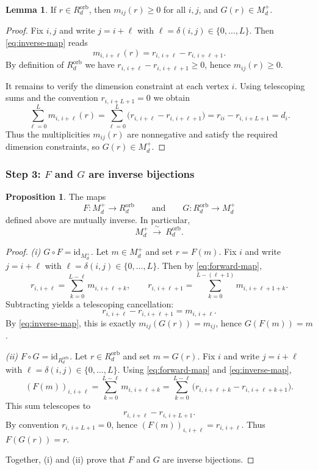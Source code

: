 \documentclass{article}
\theoremstyle{definition}
\newtheorem{proposition}[theorem]{Proposition}
\newtheorem{lemma}[theorem]{Lemma}
\begin{document}
\begin{lemma}\label{lem:inverse-well-defined}
If $r\in R_d^{\mathrm{orb}}$, then $m_{ij}(r)\ge 0$ for all $i,j$, and
$G(r)\in M_d^+$.
\end{lemma}

\begin{proof}
Fix $i,j$ and write $j=i+\ell$ with $\ell=\delta(i,j)\in\{0,\dots,L\}$.
Then \eqref{eq:inverse-map} reads
\[
m_{i,\,i+\ell}(r)=r_{i,\,i+\ell}-r_{i,\,i+\ell+1}.
\]
By definition of $R_d^{\mathrm{orb}}$ we have
$r_{i,\,i+\ell}-r_{i,\,i+\ell+1}\ge 0$, hence $m_{ij}(r)\ge 0$.

It remains to verify the dimension constraint at each vertex $i$.
Using telescoping sums and the convention $r_{i,\,i+L+1}=0$ we obtain
\[
\sum_{\ell=0}^{L} m_{i,\,i+\ell}(r)
=
\sum_{\ell=0}^{L} \bigl(r_{i,\,i+\ell}-r_{i,\,i+\ell+1}\bigr)
=
r_{ii}-r_{i,\,i+L+1}
=
d_i.
\]
Thus the multiplicities $m_{ij}(r)$ are nonnegative and satisfy the required
dimension constraints, so $G(r)\in M_d^+$.
\end{proof}

\subsubsection*{Step 3: $F$ and $G$ are inverse bijections}
\begin{proposition}\label{prop:bijection}
The maps
\[
F:M_d^+\to R_d^{\mathrm{orb}}
\qquad\text{and}\qquad
G:R_d^{\mathrm{orb}}\to M_d^+
\]
defined above are mutually inverse. In particular,
\[
M_d^+ \ \xrightarrow{\ \sim\ }\ R_d^{\mathrm{orb}}.
\]
\end{proposition}

\begin{proof}
\emph{(i) $G\circ F=\mathrm{id}_{M_d^+}$.}
Let $m\in M_d^+$ and set $r=F(m)$.
Fix $i$ and write $j=i+\ell$ with $\ell=\delta(i,j)\in\{0,\dots,L\}$.
Then by \eqref{eq:forward-map},
\[
r_{i,\,i+\ell}
=
\sum_{k=0}^{L-\ell} m_{i,\,i+\ell+k},
\qquad
r_{i,\,i+\ell+1}
=
\sum_{k=0}^{L-(\ell+1)} m_{i,\,i+\ell+1+k}.
\]
Subtracting yields a telescoping cancellation:
\[
r_{i,\,i+\ell}-r_{i,\,i+\ell+1}
=
m_{i,\,i+\ell}.
\]
By \eqref{eq:inverse-map}, this is exactly
$m_{ij}(G(r))=m_{ij}$, hence $G(F(m))=m$.

\emph{(ii) $F\circ G=\mathrm{id}_{R_d^{\mathrm{orb}}}$.}
Let $r\in R_d^{\mathrm{orb}}$ and set $m=G(r)$.
Fix $i$ and write $j=i+\ell$ with $\ell=\delta(i,j)\in\{0,\dots,L\}$.
Using \eqref{eq:forward-map} and \eqref{eq:inverse-map},
\[
(F(m))_{i,\,i+\ell}
=
\sum_{k=0}^{L-\ell} m_{i,\,i+\ell+k}
=
\sum_{k=0}^{L-\ell} \bigl(r_{i,\,i+\ell+k}-r_{i,\,i+\ell+k+1}\bigr).
\]
This sum telescopes to
\[
r_{i,\,i+\ell}-r_{i,\,i+L+1}.
\]
By convention $r_{i,\,i+L+1}=0$, hence $(F(m))_{i,\,i+\ell}=r_{i,\,i+\ell}$.
Thus $F(G(r))=r$.

Together, (i) and (ii) prove that $F$ and $G$ are inverse bijections.
\end{proof}
\end{document}
